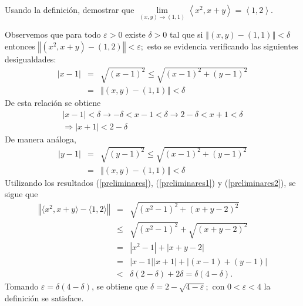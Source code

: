 \begin{parrafoitemize}
\item Usando la definición, demostrar que $\lim\limits_{(x,y) \rightarrow \left( 1,1\right) }\left\langle
  x^{2},x+y\right\rangle =\left\langle 1,2\right\rangle $.

  Observemos que  para todo $\varepsilon >0$ existe $\delta >0$ tal que si
  $\left\Vert(x,y) -\left( 1,1\right) \right\Vert <\delta $
  entonces $\left\Vert \left( x^{2},x+y\right) -\left( 1,2\right) \right\Vert<\varepsilon ;$ esto se evidencia verificando las siguientes desigualdades:
  \begin{eqnarray}\label{preliminares}
    \left\vert x-1\right\vert &=&\sqrt{(x-1) ^{2}}\leq \sqrt{\left(
    x-1\right) ^{2}+(y-1) ^{2}} \nonumber \\ &=&\left\Vert \left(x,y\right) -\left( 1,1\right) \right\Vert <\delta
  \end{eqnarray}
  De esta relación se obtiene
  \begin{multline}\label{preliminares1}
    |x-1|<\delta \rightarrow -\delta <x-1<\delta
    \rightarrow 2-\delta <x+1<\delta  \\
    \Rightarrow \left\vert x+1\right\vert<2-\delta
  \end{multline}
  De manera análoga,
  \begin{eqnarray}\label{preliminares2}
    \left\vert y-1\right\vert &=& \sqrt{(y-1) ^{2}}\leq \sqrt{\left(x-1\right) ^{2}+(y-1)  ^{2}} \nonumber \\ &=& \left\Vert \left(x,y\right) -\left( 1,1\right) \right\Vert <\delta
  \end{eqnarray}
  Utilizando los resultados (\ref{preliminares}), (\ref{preliminares1}) y (\ref{preliminares2}), se sigue que
  \begin{eqnarray*}
    \left\Vert \langle x^{2},x+y\rangle -\langle 1,2\rangle \right\Vert &=& \sqrt{\left( x^{2}-1\right) ^{2}+\left( x+y-2\right) ^{2}} \\
    &\leq & \sqrt{\left( x^{2}-1\right) ^{2}} +\sqrt{\left(x+y-2\right) ^{2}} \\
    &=& \left\vert x^{2}-1\right\vert  +\left\vert x+y-2\right\vert \\
    &=& \left\vert x-1\right\vert  \left\vert x+1\right\vert +\left\vert (x-1) +(y-1) \right\vert \\
    &<& \delta (2-\delta) +2\delta = \delta (4-\delta).
  \end{eqnarray*}
  Tomando $\varepsilon =\delta \left( 4-\delta \right) $, se obtiene que
  $\delta =2-\sqrt{4-\varepsilon };$ con $0<\varepsilon < 4$ la definición se satisface.


\end{parrafoitemize}
